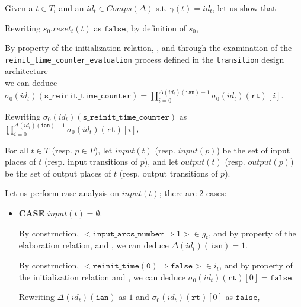 \documentclass[dvipsnames,12pt]{article}
\begin{document}
\begin{niproof}
  Given a $t\in{}T_i$ and an $id_t\in{}Comps(\Delta)$ s.t.
  $\gamma(t)=id_t$, let us show
  that\\
  
  Rewriting $s_0.reset_t(t)$ as $\mathtt{false}$, by definition of
  $s_0$,
  
  \exT{}
  
  \noindent By property of the \hvhdl{} initialization relation,
  \InCsCompT, and through the examination of the \texttt{reinit\_time\_counter\_evaluation} process defined in the \texttt{transition} design architecture\\
  we can deduce
  $\sigma_0(id_t)(\texttt{s\_reinit\_time\_counter})=\prod\limits_{i=0}^{\Delta(id_t)(\texttt{ian})-1}\sigma_0(id_t)(\texttt{rt})[i]$.

  Rewriting
  $\sigma_0(id_t)(\texttt{s\_reinit\_time\_counter})$ as $\prod\limits_{i=0}^{\Delta(id_t)(\texttt{ian})-1}\sigma_0(id_t)(\texttt{rt})[i]$,\\
  
  For all $t\in{}T$ (resp. $p\in{}P$), let $input(t)$
  (resp. $input(p)$) be the set of input places of $t$ (resp. input
  transitions of $p$), and let $output(t)$ (resp. $output(p)$) be the
  set of output places of $t$ (resp. output transitions of $p$).

  Let us perform case analysis on $input(t)$; there are 2 cases:

  \begin{itemize}
  \item \textbf{CASE} $input(t)=\emptyset$.

    By construction,
    ${<}\mathtt{input\_arcs\_number\Rightarrow}1{>}\in{}g_t$, and by
    property of the elaboration relation, and \InCsCompT{}, we can
    deduce $\Delta(id_t)(\texttt{ian})=1$.

    By construction, $<\mathtt{reinit\_time(0)\Rightarrow{}false}>\in{}i_t$, and
    by property of the initialization relation and \InCsCompT, we can
    deduce $\sigma_0(id_t)(\texttt{rt})[0]=\mathtt{false}$.

    Rewriting $\Delta(id_t)(\texttt{ian})$ as $1$ and
    $\sigma_0(id_t)(\texttt{rt})[0]$ as $\mathtt{false}$, 
    

\end{itemize}
\end{niproof}
\end{document}
